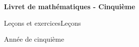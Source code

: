 \usepackage[utf8]{inputenc}
\usepackage[T1]{fontenc}
\usepackage[french]{babel}
\usepackage{lmodern}
\usepackage[a4paper,margin=2cm]{geometry}
\usepackage{pdfpages}
\usepackage[hidelinks]{hyperref}

\newcommand{\livretTitre}{Livret de mathématiques - Cinquième}
\newcommand{\modeLivret}{\ifavecexercices Leçons et exercices\else Leçons\fi}

\newcommand{\chapitre}[4]{%
  \setcounter{chapter}{#1-1}%
  \ifavecexercices
    \IfFileExists{#4}{%
    }{}%
  \fi
}



\begin{titlepage}
  \centering
  \vspace*{4cm}
  {\Huge\bfseries \livretTitre\par}
  \vspace{1.5cm}
  {\Large \modeLivret\par}
  \vfill
  {\large Année de cinquième\par}
\end{titlepage}

\tableofcontents
\clearpage

